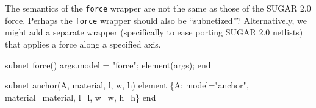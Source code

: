 The semantics of the {\tt{}force} wrapper are not the same
as those of the SUGAR 2.0 force.
Perhaps the {\tt{}force} wrapper should also be ``subnetized''?
Alternatively, we might add a separate wrapper (specifically
to ease porting SUGAR 2.0 netlists) that applies a force along 
a specified axis.

\nwenddocs{}\plusendmoddef
subnet force()
  args.model    = "force";
  element(args);
end

\nwendcode{}\nwdocspar

\nwenddocs{}\plusendmoddef
subnet anchor(A, material, l, w, h)
  element \{A; model="anchor", material=material, l=l, w=w, h=h\}
end

\nwendcode{}

%
%
\nwdocspar

\nwenddocs{}
